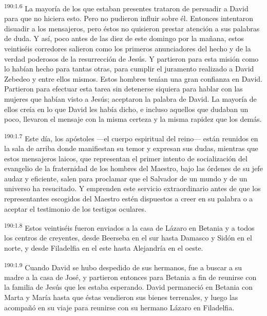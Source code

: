 \par
\textsuperscript{190:1.6} La mayoría de los que estaban presentes trataron de persuadir a David para que no hiciera esto. Pero no pudieron influir sobre él. Entonces intentaron disuadir a los mensajeros, pero éstos no quisieron prestar atención a sus palabras de duda. Y así, poco antes de las diez de este domingo por la mañana, estos veintiséis corredores salieron como los primeros anunciadores del hecho y de la verdad poderosos de la resurrección de Jesús. Y partieron para esta misión como lo habían hecho para tantas otras, para cumplir el juramento realizado a David Zebedeo y entre ellos mismos. Estos hombres tenían una gran confianza en David. Partieron para efectuar esta tarea sin detenerse siquiera para hablar con las mujeres que habían visto a Jesús; aceptaron la palabra de David. La mayoría de ellos creía en lo que David les había dicho, e incluso aquellos que dudaban un poco, llevaron el mensaje con la misma certeza y la misma rapidez que los demás.

\par
\textsuperscript{190:1.7} Este día, los apóstoles ---el cuerpo espiritual del reino--- están reunidos en la sala de arriba donde manifiestan su temor y expresan sus dudas, mientras que estos mensajeros laicos, que representan el primer intento de socialización del evangelio de la fraternidad de los hombres del Maestro, bajo las órdenes de su jefe audaz y eficiente, salen para proclamar que el Salvador de un mundo y de un universo ha resucitado. Y emprenden este servicio extraordinario antes de que los representantes escogidos del Maestro estén dispuestos a creer en su palabra o a aceptar el testimonio de los testigos oculares.

\par
\textsuperscript{190:1.8} Estos veintiséis fueron enviados a la casa de Lázaro en Betania y a todos los centros de creyentes, desde Beerseba en el sur hasta Damasco y Sidón en el norte, y desde Filadelfia en el este hasta Alejandría en el oeste.

\par
\textsuperscript{190:1.9} Cuando David se hubo despedido de sus hermanos, fue a buscar a su madre a la casa de José, y partieron entonces para Betania a fin de reunirse con la familia de Jesús que les estaba esperando. David permaneció en Betania con Marta y María hasta que éstas vendieron sus bienes terrenales, y luego las acompañó en su viaje para reunirse con su hermano Lázaro en Filadelfia.


